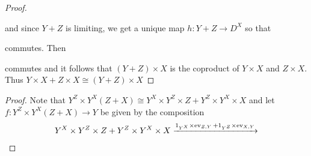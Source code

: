 \begin{solution}
\begin{exercises}
\begin{proof}
\begin{center}
\begin{tikzcd}
                \end{tikzcd}
            \end{center}
            and since $Y+Z$ is limiting, we get a unique map $h\colon Y+Z\to D^X$ so that
            \begin{center}
            \end{center}
            commutes. Then
            \begin{center}
            \end{center}
            commutes and it follows that $(Y+Z)\times X$ is the coproduct of $Y\times X$ and $Z\times X$.
            Thus $Y\times X+Z\times X\cong (Y+Z)\times X$
    \end{proof}
    \item\begin{proof}
        Note that $Y^Z\times Y^X(Z+X)\cong Y^X\times Y^Z\times Z+Y^Z\times Y^X\times X$ and let $f\colon Y^Z\times Y^X(Z+X)\to Y$ be given by the composition
        \begin{multline*}
            Y^X\times Y^Z\times Z+Y^Z\times Y^X\times X\xrightarrow{1_{Y^X}\times\ev{Z,Y}+1_{Y^Z}\times\ev{X,Y}}\\

\end{multline*}
\end{proof}
\end{exercises}
\end{solution}
